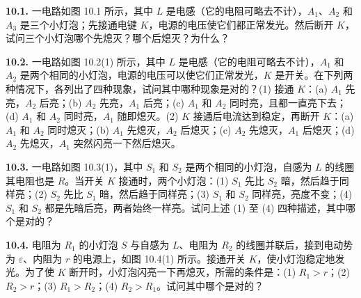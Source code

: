 \textbf{10.1.} 一电路如图 10.1 所示，其中 $L$ 是电感（它的电阻可略去不计），$A_1$、$A_2$ 和 $A_3$ 是三个小灯泡；先接通电键 $K$，电源的电压使它们都正常发光。然后断开 $K$，试问三个小灯泡哪个先熄灭？哪个后熄灭？为什么？

\begin{center}
\end{center}

\vfill
\newpage

\textbf{10.2.} 一电路如图 10.2(1) 所示，其中 $L$ 是电感（它的电阻可略去不计），$A_1$ 和 $A_2$ 是两个相同的小灯泡，电源的电压可以使它们正常发光，$K$ 是开关。在下列两种情况下，各列出了四种现象，试问其中哪种现象是对的？(1) 接通 $K$：(a) $A_1$ 先亮，$A_2$ 后亮；(b) $A_2$ 先亮，$A_1$ 后亮；(c) $A_1$ 和 $A_2$ 同时亮，且都一直亮下去；(d) $A_1$ 和 $A_2$ 同时亮，$A_1$ 随即熄灭。(2) $K$ 接通后电流达到稳定，再断开 $K$：(a) $A_1$ 和 $A_2$ 同时熄灭；(b) $A_1$ 先熄灭，$A_2$ 后熄灭；(c) $A_2$ 先熄灭，$A_1$ 后熄灭；(d) $A_2$ 先熄灭，$A_1$ 突然闪亮一下然后熄灭。

\begin{center}
\end{center}

\vfill
\newpage

\textbf{10.3.} 一电路如图 10.3(1)，其中 $S_1$ 和 $S_2$ 是两个相同的小灯泡，自感为 $L$ 的线圈其电阻也是 $R$。当开关 $K$ 接通时，两个小灯泡：(1) $S_1$ 先比 $S_2$ 暗，然后趋于同样亮；(2) $S_2$ 先比 $S_1$ 暗，然后趋于同样亮；(3) $S_1$ 和 $S_2$ 同样亮，亮度不变；(4) $S_1$ 和 $S_2$ 都是先暗后亮，两者始终一样亮。试问上述 (1) 至 (4) 四种描述，其中哪个是对的？

\begin{center}
\end{center}

\vfill
\newpage

\textbf{10.4.} 电阻为 $R_1$ 的小灯泡 $S$ 与自感为 $L$、电阻为 $R_2$ 的线圈并联后，接到电动势为 $\varepsilon$、内阻为 $r$ 的电源上，如图 10.4(1) 所示。接通开关 $K$，使小灯泡稳定地发光。为了使 $K$ 断开时，小灯泡闪亮一下再熄灭，所需的条件是：(1) $R_1 > r$；(2) $R_2 > r$；(3) $R_1 > R_2$；(4) $R_2 > R_1$。试问其中哪个是对的？

\begin{center}
\end{center}

